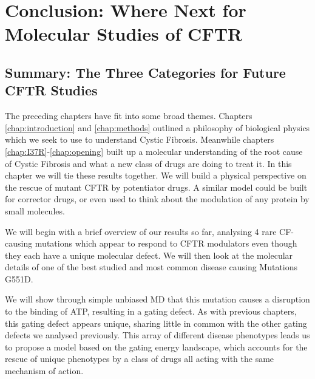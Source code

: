 \chapter{Conclusion: Where Next for Molecular Studies of CFTR}
\label{chap:conclusion}

\section{Summary: The Three Categories for Future CFTR Studies}

The preceding chapters have fit into some broad themes. Chapters \ref{chap:introduction} and \ref{chap:methods} outlined a philosophy of biological physics which we seek to use to understand Cystic Fibrosis. Meanwhile chapters \ref{chap:I37R}-\ref{chap:opening} built up a molecular understanding of the root cause of Cystic Fibrosis and what a new class of drugs are doing to treat it. In this chapter we will tie these results together. We will build a physical perspective on the rescue of mutant CFTR by potentiator drugs. A similar model could be built for corrector drugs, or even used to think about the modulation of any protein by small molecules.


We will begin with a brief overview of our results so far, analysing 4 rare CF-causing mutations which appear to respond to CFTR modulators even though they each have a unique molecular defect. We will then look at the molecular details of one of the best studied and most common disease causing Mutations G551D. 

We will show through simple unbiased MD that this mutation causes a disruption to the binding of ATP, resulting in a gating defect. As with previous chapters, this gating defect appears unique, sharing little in common with the other gating defects we analysed previously. This array of different disease phenotypes leads us to propose a model based on the gating energy landscape, which accounts for the rescue of unique phenotypes by a class of drugs all acting with the same mechanism of action. 



